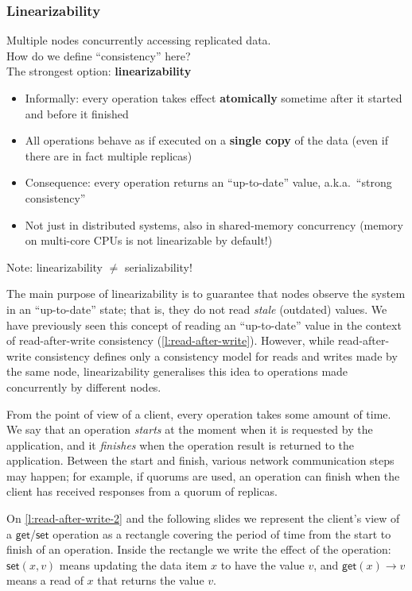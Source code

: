\begin{frame}
    \label{s:linearizability}
    \frametitle{Linearizability}
    Multiple nodes concurrently accessing replicated data.\\
    How do we define ``consistency'' here?\\[1em]\pause
    The strongest option: \textbf{linearizability}\pause
    \begin{itemize}
        \item Informally: every operation takes effect \textbf{atomically} sometime after it started and before it finished\pause
        \item All operations behave as if executed on a \textbf{single copy} of the data (even if there are in fact multiple replicas)\pause
        \item Consequence: every operation returns an ``up-to-date'' value, a.k.a.\ ``strong consistency''\pause
        \item Not just in distributed systems, also in shared-memory concurrency (memory on multi-core CPUs is not linearizable by default!)\pause
    \end{itemize}
    Note: linearizability $\neq$ serializability!
\end{frame}
\label{l:linearizability}

The main purpose of linearizability is to guarantee that nodes observe the system in an ``up-to-date'' state; that is, they do not read \emph{stale} (outdated) values.
We have previously seen this concept of reading an ``up-to-date'' value in the context of read-after-write consistency (\autoref{l:read-after-write}).
However, while read-after-write consistency defines only a consistency model for reads and writes made by the same node, linearizability generalises this idea to operations made concurrently by different nodes.

From the point of view of a client, every operation takes some amount of time.
We say that an operation \emph{starts} at the moment when it is requested by the application, and it \emph{finishes} when the operation result is returned to the application.
Between the start and finish, various network communication steps may happen; for example, if quorums are used, an operation can finish when the client has received responses from a quorum of replicas.

On \autoref{l:read-after-write-2} and the following slides we represent the client's view of a $\mathsf{get}$/$\mathsf{set}$ operation as a rectangle covering the period of time from the start to finish of an operation.
Inside the rectangle we write the effect of the operation: $\mathsf{set}(x,v)$ means updating the data item $x$ to have the value $v$, and $\mathsf{get}(x) \rightarrow v$ means a read of $x$ that returns the value $v$.

